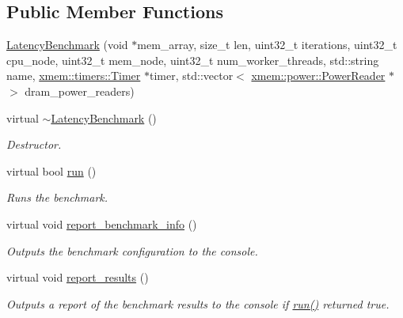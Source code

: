 \subsection*{Public Member Functions}
\begin{DoxyCompactItemize}
\item 
\hyperlink{classxmem_1_1benchmark_1_1_latency_benchmark_a485434e0f506427b28073a2a3e287e21}{Latency\+Benchmark} (void $\ast$mem\+\_\+array, size\+\_\+t len, uint32\+\_\+t iterations, uint32\+\_\+t cpu\+\_\+node, uint32\+\_\+t mem\+\_\+node, uint32\+\_\+t num\+\_\+worker\+\_\+threads, std\+::string name, \hyperlink{classxmem_1_1timers_1_1_timer}{xmem\+::timers\+::\+Timer} $\ast$timer, std\+::vector$<$ \hyperlink{classxmem_1_1power_1_1_power_reader}{xmem\+::power\+::\+Power\+Reader} $\ast$ $>$ dram\+\_\+power\+\_\+readers)
\item 
\hypertarget{classxmem_1_1benchmark_1_1_latency_benchmark_a39da6c4e2374ad96a939c87a4e8b8453}{}virtual \hyperlink{classxmem_1_1benchmark_1_1_latency_benchmark_a39da6c4e2374ad96a939c87a4e8b8453}{$\sim$\+Latency\+Benchmark} ()\label{classxmem_1_1benchmark_1_1_latency_benchmark_a39da6c4e2374ad96a939c87a4e8b8453}

\begin{DoxyCompactList}\small\item\em Destructor. \end{DoxyCompactList}\item 
virtual bool \hyperlink{classxmem_1_1benchmark_1_1_latency_benchmark_ab68c299bf41fb30f9be597ff79188139}{run} ()
\begin{DoxyCompactList}\small\item\em Runs the benchmark. \end{DoxyCompactList}\item 
\hypertarget{classxmem_1_1benchmark_1_1_latency_benchmark_a2714dfbf9be2eef8ac4089ad610db651}{}virtual void \hyperlink{classxmem_1_1benchmark_1_1_latency_benchmark_a2714dfbf9be2eef8ac4089ad610db651}{report\+\_\+benchmark\+\_\+info} ()\label{classxmem_1_1benchmark_1_1_latency_benchmark_a2714dfbf9be2eef8ac4089ad610db651}

\begin{DoxyCompactList}\small\item\em Outputs the benchmark configuration to the console. \end{DoxyCompactList}\item 
\hypertarget{classxmem_1_1benchmark_1_1_latency_benchmark_ae16f89eb9f413734989ef8c51ec3e066}{}virtual void \hyperlink{classxmem_1_1benchmark_1_1_latency_benchmark_ae16f89eb9f413734989ef8c51ec3e066}{report\+\_\+results} ()\label{classxmem_1_1benchmark_1_1_latency_benchmark_ae16f89eb9f413734989ef8c51ec3e066}

\begin{DoxyCompactList}\small\item\em Outputs a report of the benchmark results to the console if \hyperlink{classxmem_1_1benchmark_1_1_latency_benchmark_ab68c299bf41fb30f9be597ff79188139}{run()} returned true. \end{DoxyCompactList}\end{DoxyCompactItemize}
